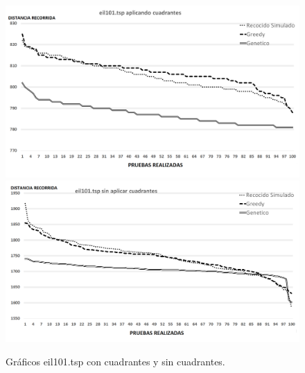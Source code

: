  \begin{figure}[hbtp]
    \centering
        \includegraphics[width=1\textwidth]{PruebasResultados/Experimentos_Graficos_Con/eil101.png}
        \includegraphics[width=1\textwidth]{PruebasResultados/Experimentos_Graficos_Sin/eil101.png}
        \caption{Gráficos eil101.tsp con cuadrantes y sin cuadrantes.}
        \label{fig:eil101_grafica.png}
\end{figure}
\newpage

